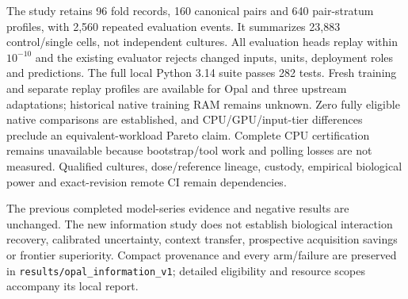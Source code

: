 The study retains 96 fold records, 160 canonical pairs and 640 pair-stratum profiles, with 2,560 repeated evaluation events. It summarizes 23,883 control/single cells, not independent cultures. All evaluation heads replay within $10^{-10}$ and the existing evaluator rejects changed inputs, units, deployment roles and predictions. The full local Python 3.14 suite passes 282 tests. Fresh training and separate replay profiles are available for Opal and three upstream adaptations; historical native training RAM remains unknown. Zero fully eligible native comparisons are established, and CPU/GPU/input-tier differences preclude an equivalent-workload Pareto claim. Complete CPU certification remains unavailable because bootstrap/tool work and polling losses are not measured. Qualified cultures, dose/reference lineage, custody, empirical biological power and exact-revision remote CI remain dependencies.

The previous completed model-series evidence and negative results are unchanged. The new information study does not establish biological interaction recovery, calibrated uncertainty, context transfer, prospective acquisition savings or frontier superiority. Compact provenance and every arm/failure are preserved in \texttt{results/opal\_information\_v1}; detailed eligibility and resource scopes accompany its local report.
